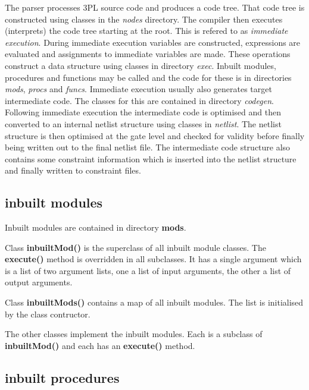 \documentclass[10pt,a4paper,twoside,fleqn]{book}
\begin{document}
        The parser processes 3PL source code and produces a code tree. That code
        tree is constructed using classes in the {\em nodes} directory. The compiler
        then executes (interprets) the code tree starting at the root. This is
        refered to as {\em immediate execution}. During immediate execution
        variables are constructed, expressions are evaluated and assignments to
        immediate variables are made. These operations construct a data structure
        using classes in directory {\em exec}. Inbuilt modules, procedures and
        functions may be called and the code for these is in directories {\em mods},
        {\em procs} and {\em funcs}. Immediate execution usually also generates
        target intermediate code. The classes for this are contained in directory
        {\em codegen}. Following immediate execution the intermediate code is
        optimised and then converted to an internal netlist structure using classes
        in {\em netlist}. The netlist structure is then optimised at the gate level
        and checked for validity before finally being written out to the final
        netlist file. The intermediate code structure also contains some constraint
        information which is inserted into the netlist structure and finally written
        to constraint files.


        \subsection{inbuilt modules}

            Inbuilt modules are contained in directory {\bf mods}.

            Class {\bf inbuiltMod()} is the superclass of all inbuilt module
            classes. The {\bf execute()} method is overridden in all subclasses. It
            has a single argument which is a list of two argument lists, one a list
            of input arguments, the other a list of output arguments.

            Class {\bf inbuiltMods()} contains a map of all inbuilt modules. The
            list is initialised by the class contructor.

            The other classes implement the inbuilt modules. Each is a subclass
            of {\bf inbuiltMod()} and each has an {\bf execute()} method.
        
        \subsection{inbuilt procedures}
\end{document}
